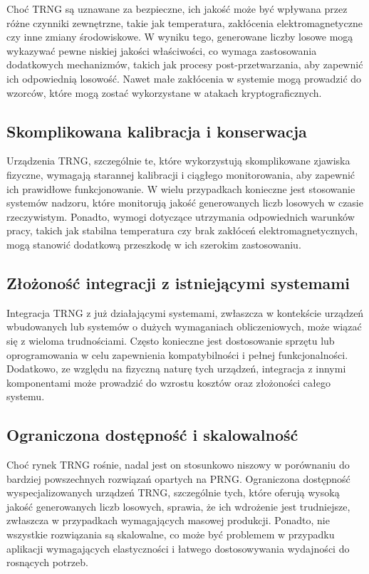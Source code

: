 Choć TRNG są uznawane za bezpieczne, ich jakość może być wpływana przez różne czynniki zewnętrzne, takie jak temperatura, zakłócenia elektromagnetyczne czy inne zmiany środowiskowe. W wyniku tego, generowane liczby losowe mogą wykazywać pewne niskiej jakości właściwości, co wymaga zastosowania dodatkowych mechanizmów, takich jak procesy post-przetwarzania, aby zapewnić ich odpowiednią losowość. Nawet małe zakłócenia w systemie mogą prowadzić do wzorców, które mogą zostać wykorzystane w atakach kryptograficznych.

\subsection{Skomplikowana kalibracja i konserwacja}

Urządzenia TRNG, szczególnie te, które wykorzystują skomplikowane zjawiska fizyczne, wymagają starannej kalibracji i ciągłego monitorowania, aby zapewnić ich prawidłowe funkcjonowanie. W wielu przypadkach konieczne jest stosowanie systemów nadzoru, które monitorują jakość generowanych liczb losowych w czasie rzeczywistym. Ponadto, wymogi dotyczące utrzymania odpowiednich warunków pracy, takich jak stabilna temperatura czy brak zakłóceń elektromagnetycznych, mogą stanowić dodatkową przeszkodę w ich szerokim zastosowaniu.

\subsection{Złożoność integracji z istniejącymi systemami}

Integracja TRNG z już działającymi systemami, zwłaszcza w kontekście urządzeń wbudowanych lub systemów o dużych wymaganiach obliczeniowych, może wiązać się z wieloma trudnościami. Często konieczne jest dostosowanie sprzętu lub oprogramowania w celu zapewnienia kompatybilności i pełnej funkcjonalności. Dodatkowo, ze względu na fizyczną naturę tych urządzeń, integracja z innymi komponentami może prowadzić do wzrostu kosztów oraz złożoności całego systemu.

\subsection{Ograniczona dostępność i skalowalność}

Choć rynek TRNG rośnie, nadal jest on stosunkowo niszowy w porównaniu do bardziej powszechnych rozwiązań opartych na PRNG. Ograniczona dostępność wyspecjalizowanych urządzeń TRNG, szczególnie tych, które oferują wysoką jakość generowanych liczb losowych, sprawia, że ich wdrożenie jest trudniejsze, zwłaszcza w przypadkach wymagających masowej produkcji. Ponadto, nie wszystkie rozwiązania są skalowalne, co może być problemem w przypadku aplikacji wymagających elastyczności i łatwego dostosowywania wydajności do rosnących potrzeb.

